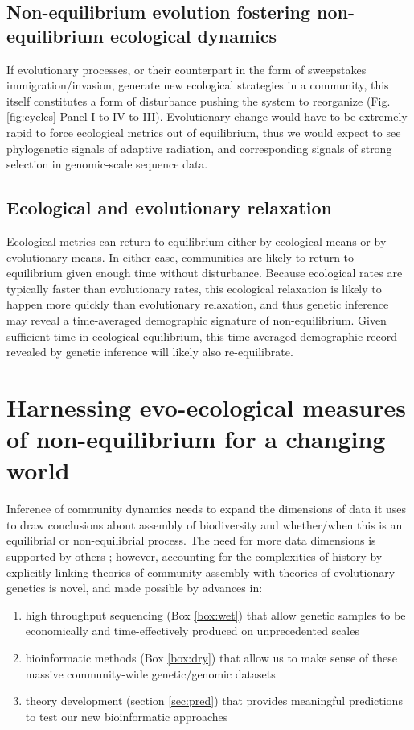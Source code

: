 \documentclass[12pt]{article}
\newcounter{Box}
\begin{document}
\subsection{Non-equilibrium evolution fostering non-equilibrium ecological dynamics}

If evolutionary processes, or their counterpart in the form of
sweepstakes immigration/invasion, generate new ecological strategies
in a community, this itself constitutes a form of disturbance pushing
the system to reorganize (Fig.
\ref{fig:cycles} Panel I to IV to III).  Evolutionary change would
have to be extremely rapid to force ecological metrics out of
equilibrium, thus we would
expect to see phylogenetic signals of adaptive radiation, and
corresponding signals of strong selection in genomic-scale sequence
data.

\subsection{Ecological and evolutionary relaxation}

Ecological metrics can return to equilibrium either by ecological
means or by evolutionary means. In either case, communities are likely to return to
equilibrium given enough time without disturbance. Because ecological
% 
% 
rates are typically faster than evolutionary rates, this ecological
relaxation is likely to happen more quickly than evolutionary
relaxation, and thus genetic inference may reveal a time-averaged
demographic signature of non-equilibrium. Given sufficient time in ecological equilibrium, this time averaged
demographic record revealed by genetic inference will likely also
re-equilibrate.


\section{Harnessing evo-ecological measures of non-equilibrium for a changing world}

Inference of community dynamics needs to expand the dimensions of data
it uses to draw conclusions about assembly of biodiversity and
whether/when this is an equilibrial or non-equilibrial process. The
need for more data dimensions is supported by others
\citep{McGill2007-hx}; however, accounting for the complexities of
history by explicitly linking theories of community assembly with
theories of evolutionary genetics is novel, and made possible by
advances in:
\begin{enumerate}
\item high throughput sequencing (Box \ref{box:wet}) that allow
  genetic samples to be economically and time-effectively produced on
  unprecedented scales
\item bioinformatic methods (Box \ref{box:dry}) that allow
  us to make sense of these massive community-wide genetic/genomic
  datasets
\item theory development (section \ref{sec:pred}) that provides
  meaningful predictions to test our new bioinformatic approaches
\end{enumerate}
\end{document}
